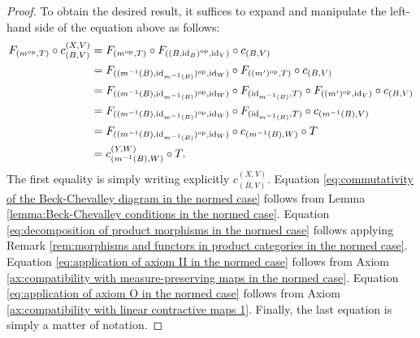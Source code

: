 \documentclass{amsart}
\theoremstyle{definition}
\theoremstyle{plain}
\newcommand{\id}{\operatorname{id}}
\begin{document}
        \begin{proof}
            To obtain the desired result, it suffices to expand and manipulate the left-hand side of the equation above as follows:
            \begin{align}
                F_{\left( m^\mathrm{op},T \right)} \circ c_{(B,V)}^{(X,V)} &= F_{\left( m^\mathrm{op},T \right)} \circ F_{\left( \left( B,\id_B \right)^{\mathrm{op}},\id _V \right)} \circ c_{(B,V)} \notag \\
                &= F_{( ( m^{-1}(B),\id_{m^{-1}(B)} )^{\mathrm{op}},\id_W )} \circ F_{\left( (m')^{\mathrm{op}},T \right)} \circ c_{(B,V)} \label{eq:commutativity of the Beck-Chevalley diagram in the normed case} \\
                &= F_{( ( m^{-1}(B),\id_{m^{-1}(B)} )^{\mathrm{op}},\id_W )} \circ F_{(\id_{m^{-1}(B)},T)} \circ F_{\left( (m')^{\mathrm{op}},\id_V \right)} \circ c_{(B,V)} \label{eq:decomposition of product morphisms in the normed case} \\
                &= F_{( ( m^{-1}(B),\id_{m^{-1}(B)} )^{\mathrm{op}},\id_W )} \circ F_{(\id_{m^{-1}(B)},T)} \circ c_{\left( m^{-1}(B),V \right)} \label{eq:application of axiom II in the normed case} \\
                &= F_{( ( m^{-1}(B),\id_{m^{-1}(B)} )^{\mathrm{op}},\id_W )} \circ c_{\left( m^{-1}(B),W \right)} \circ T \label{eq:application of axiom O in the normed case} \\
                &= c_{\left( m^{-1}(B),W \right)}^{(Y,W)} \circ T \notag.
            \end{align}
            The first equality is simply writing explicitly $c_{(B,V)}^{(X,V)}$.
            Equation \eqref{eq:commutativity of the Beck-Chevalley diagram in the normed case} follows from Lemma \ref{lemma:Beck-Chevalley conditions in the normed case}.
            Equation \eqref{eq:decomposition of product morphisms in the normed case} follows applying Remark \ref{rem:morphisms and functors in product categories in the normed case}.
            Equation \eqref{eq:application of axiom II in the normed case} follows from Axiom \ref{ax:compatibility with measure-preserving maps in the normed case}.
            Equation \eqref{eq:application of axiom O in the normed case} follows from Axiom \ref{ax:compatibility with linear contractive maps 1}.
            Finally, the last equation is simply a matter of notation.  
        \end{proof}
        
\end{document}
